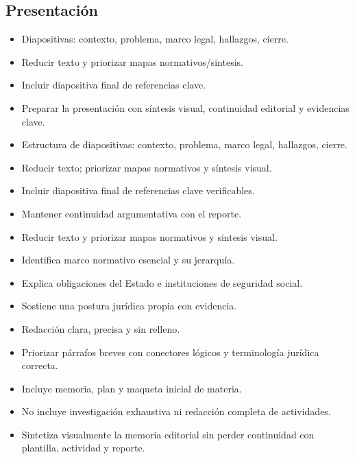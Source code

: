 \documentclass[12pt]{article}
\begin{document}
\subsection*{Presentación}
\begin{itemize}[leftmargin=*]
  \item Diapositivas: contexto, problema, marco legal, hallazgos, cierre.
  \item Reducir texto y priorizar mapas normativos/sintesis.
  \item Incluir diapositiva final de referencias clave.
  \item Preparar la presentación con síntesis visual, continuidad editorial y evidencias clave.
  \item Estructura de diapositivas: contexto, problema, marco legal, hallazgos, cierre.
  \item Reducir texto; priorizar mapas normativos y síntesis visual.
  \item Incluir diapositiva final de referencias clave verificables.
  \item Mantener continuidad argumentativa con el reporte.
  \item Reducir texto y priorizar mapas normativos y sintesis visual.
  \item Identifica marco normativo esencial y su jerarquía.
  \item Explica obligaciones del Estado e instituciones de seguridad social.
  \item Sostiene una postura jurídica propia con evidencia.
  \item Redacción clara, precisa y sin relleno.
  \item Priorizar párrafos breves con conectores lógicos y terminología jurídica correcta.
  \item Incluye memoria, plan y maqueta inicial de materia.
  \item No incluye investigación exhaustiva ni redacción completa de actividades.
  \item Sintetiza visualmente la memoria editorial sin perder continuidad con plantilla, actividad y reporte.
\end{itemize}
\end{document}
